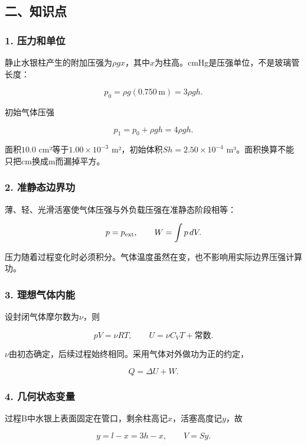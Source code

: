 \documentclass[12pt,a4paper,fontset=fandol]{ctexart}
\begin{document}
\subsection{二、知识点}\label{ux4e8cux77e5ux8bc6ux70b9-1}

\subsubsection{1. 压力和单位}\label{ux538bux529bux548cux5355ux4f4d}

静止水银柱产生的附加压强为\(\rho g x\)，其中\(x\)为柱高。cmHg是压强单位，不是玻璃管长度：

\[
p_0=\rho g(0.750\,\mathrm m)=3\rho gh.
\]

初始气体压强

\[
p_1=p_0+\rho gh=4\rho gh.
\]

面积\(10.0\) cm²等于\(1.00\times10^{-3}\)
m²，初始体积\(Sh=2.50\times10^{-4}\)
m³。面积换算不能只把cm换成m而漏掉平方。

\subsubsection{2.
准静态边界功}\label{ux51c6ux9759ux6001ux8fb9ux754cux529f}

薄、轻、光滑活塞使气体压强与外负载压强在准静态阶段相等：

\[
p=p_{\rm ext},\qquad
W=\int p\,dV.
\]

压力随着过程变化时必须积分。气体温度虽然在变，也不影响用实际边界压强计算功。

\subsubsection{3.
理想气体内能}\label{ux7406ux60f3ux6c14ux4f53ux5185ux80fd}

设封闭气体摩尔数为\(\nu\)，则

\[
pV=\nu RT,\qquad
U=\nu C_VT+\text{常数}.
\]

\(\nu\)由初态确定，后续过程始终相同。采用气体对外做功为正的约定，

\[
Q=\Delta U+W.
\]

\subsubsection{4.
几何状态变量}\label{ux51e0ux4f55ux72b6ux6001ux53d8ux91cf}

过程B中水银上表面固定在管口，剩余柱高记\(x\)，活塞高度记\(y\)，故

\[
y=l-x=3h-x,\qquad V=Sy.
\]
\end{document}
